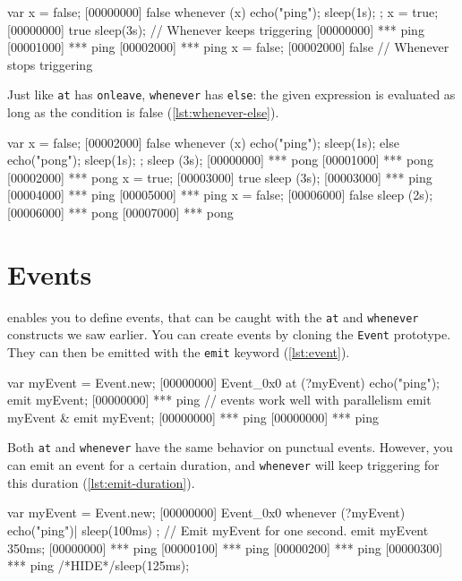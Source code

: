 \documentclass[openright,twoside,12pt]{report}
\begin{document}
\begin{urbiscript}[caption=Using \texttt{whenever}, label=lst:whenever]
var x = false;
[00000000] false
whenever (x)
{
  echo("ping");
  sleep(1s);
};
x = true;
[00000000] true
sleep(3s);
// Whenever keeps triggering
[00000000] *** ping
[00001000] *** ping
[00002000] *** ping
x = false;
[00002000] false
// Whenever stops triggering
\end{urbiscript}

Just like \lstinline|at| has \lstinline|onleave|, \lstinline|whenever|
has \lstinline|else|: the given expression is evaluated as long as the
condition is false (\autoref{lst:whenever-else}).

\begin{urbiscript}[caption=Using \texttt{whenever ... else},
  label=lst:whenever-else]
var x = false;
[00002000] false
whenever (x)
{
  echo("ping");
  sleep(1s);
}
else
{
  echo("pong");
  sleep(1s);
};
sleep (3s);
[00000000] *** pong
[00001000] *** pong
[00002000] *** pong
x = true;
[00003000] true
sleep (3s);
[00003000] *** ping
[00004000] *** ping
[00005000] *** ping
x = false;
[00006000] false
sleep (2s);
[00006000] *** pong
[00007000] *** pong
\end{urbiscript}

\section{Events}

\urbi enables you to define events, that can be caught with the
\lstinline|at| and \lstinline|whenever| constructs we saw earlier. You
can create events by cloning the \lstinline|Event| prototype. They can
then be emitted with the \lstinline|emit| keyword (\autoref{lst:event}).

\begin{urbiscript}[caption=Using events, label=lst:event]
var myEvent = Event.new;
[00000000] Event_0x0
at (?myEvent)
  echo("ping");
emit myEvent;
[00000000] *** ping
// events work well with parallelism
emit myEvent & emit myEvent;
[00000000] *** ping
[00000000] *** ping
\end{urbiscript}

Both \lstinline|at| and \lstinline|whenever| have the same behavior on
punctual events. However, you can emit an event for a certain
duration, and \lstinline|whenever| will keep triggering for this
duration (\autoref{lst:emit-duration}).

\begin{urbiscript}[caption=Emitting events with a duration,
  label=lst:emit-duration]
var myEvent = Event.new;
[00000000] Event_0x0
whenever (?myEvent)
{
  echo("ping")|
  sleep(100ms)
};
// Emit myEvent for one second.
emit myEvent ~ 350ms;
[00000000] *** ping
[00000100] *** ping
[00000200] *** ping
[00000300] *** ping
/*HIDE*/sleep(125ms);
\end{urbiscript}
\end{document}
